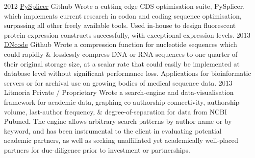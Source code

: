 \documentclass[]{friggeri-cv} %
\begin{document}
\begin{entrylist}
\entry
{2012}
{\href{https://github.com/cathalgarvey/pysplicer}{PySplicer}}
{Github}
{Wrote a cutting edge CDS optimisation suite, PySplicer, which implements current
research in codon and coding sequence optimisation, surpassing all other freely available tools.
Used in-house to design fluorescent protein expression constructs successfully, 
with exceptional expression levels.
}
\entry
{2013}
{\href{https://github.com/cathalgarvey/dncode}{DNcode}}
{Github}
{Wrote a compression function for nucleotide sequences which could rapidly \& 
losslessly compress DNA or RNA sequences to one quarter of their original storage 
size, at a scalar rate that could easily be implemented at database level without 
significant performance loss. Applications for bioinformatic servers or for 
archival use on growing bodies of medical sequence data.
}
\entry
{2013}
{Litmoria}
{Private / Proprietary}
{Wrote a search-engine and data-visualisation framework for academic data, graphing
co-authorship connectivity, authorship volume, last-author frequency, \& degree-of-separation
for data from NCBI Pubmed. The engine allows arbitrary search patterns by author name
or by keyword, and has been instrumental to the client in evaluating potential academic
partners, as well as seeking unaffiliated yet academically well-placed partners for
due-diligence prior to investment or partnerships.
}
\end{entrylist}

\pagebreak
\end{document}
